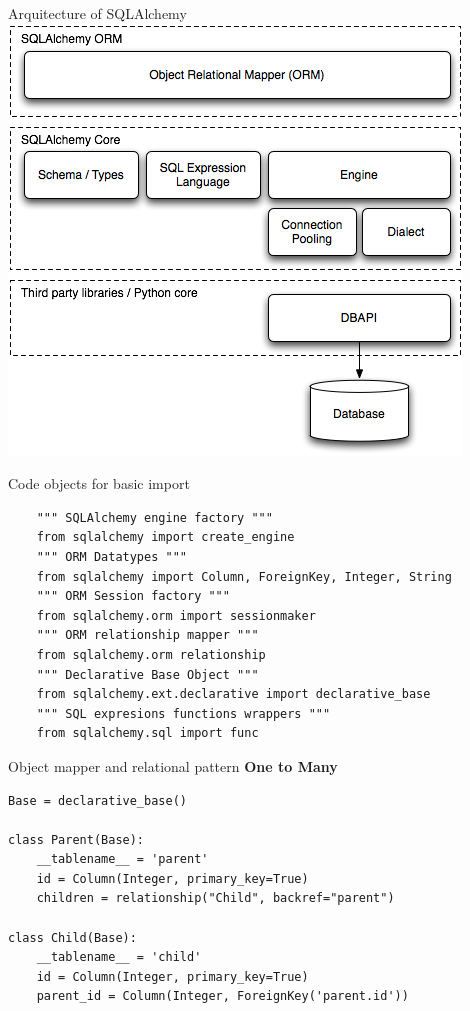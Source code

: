 \documentclass[seagull]{beamer}
\begin{document}
\begin{frame}{Arquitecture of SQLAlchemy}
	\centering\includegraphics[scale=0.5]{sqla-arch.png}
\end{frame}

\begin{frame}[fragile]{Code objects for basic import}
\begin{verbatim}
	""" SQLAlchemy engine factory """
	from sqlalchemy import create_engine
	""" ORM Datatypes """ 
	from sqlalchemy import Column, ForeignKey, Integer, String
	""" ORM Session factory """ 
	from sqlalchemy.orm import sessionmaker
	""" ORM relationship mapper """ 
	from sqlalchemy.orm relationship
	""" Declarative Base Object """ 
	from sqlalchemy.ext.declarative import declarative_base
	""" SQL expresions functions wrappers """ 
	from sqlalchemy.sql import func
\end{verbatim}
\end{frame}

\begin{frame}[fragile]{Object mapper and relational pattern}
\textbf{One to Many}
\begin{verbatim}
Base = declarative_base()

class Parent(Base):
    __tablename__ = 'parent'
    id = Column(Integer, primary_key=True)
    children = relationship("Child", backref="parent")

class Child(Base):
    __tablename__ = 'child'
    id = Column(Integer, primary_key=True)
    parent_id = Column(Integer, ForeignKey('parent.id'))
        
\end{verbatim}
\end{frame}
\end{document}
